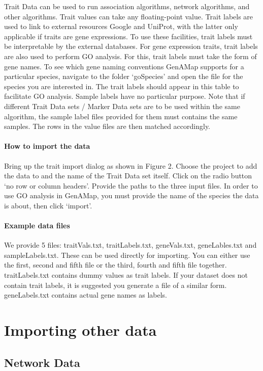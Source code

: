 \documentclass{article}
\begin{document}
Trait Data can be used to run association algorithms, network algorithms, and other algorithms. Trait values can take any floating-point value. Trait labels are used to link to external resources Google and UniProt, with the latter only applicable if traits are gene expressions. To use these facilities, trait labels must be interpretable by the external databases. For gene expression traits, trait labels are also used to perform GO analysis. For this, trait labels must take the form of gene names. To see which gene naming conventions GenAMap supports for a particular species, navigate to the folder `goSpecies' and open the file for the species you are interested in. The trait labels should appear in this table to facilitate GO analysis. Sample labels have no particular purpose. Note that if different Trait Data sets / Marker Data sets are to be used within the same algorithm, the sample label files provided for them must contains the same samples. The rows in the value files are then matched accordingly.

\paragraph{How to import the data} Bring up the trait import dialog as shown in Figure 2. Choose the project to add the data to and the name of the Trait Data set itself. Click on the radio button `no row or column headers'. Provide the paths to the three input files. In order to use GO analysis in GenAMap, you must provide the name of the species the data is about, then click `import'.

\paragraph{Example data files} We provide 5 files: traitVals.txt, traitLabels.txt, geneVals.txt, geneLables.txt and sampleLabels.txt. These can be used directly for importing. You can either use the first, second and fifth file or the third, fourth and fifth file together. traitLabels.txt contains dummy values as trait labels. If your dataset does not contain trait labels, it is suggested you generate a file of a similar form. geneLabels.txt contains actual gene names as labels.

\section{Importing other data}

\subsection{Network Data}
\end{document}
